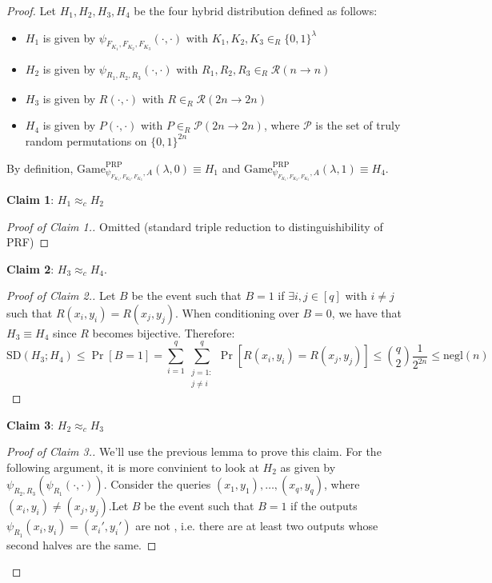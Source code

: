 \documentclass[a4paper, 12pt]{report}
\begin{document}
    \begin{proof}
        Let $H_1, H_2, H_3, H_4$ be the four hybrid distribution defined as follows:
        \begin{itemize}
            \item $H_1$ is given by $\psi_{F_{K_1}, F_{K_2}, F_{K_3}}(\cdot, \cdot)$ with $K_1,K_2,K_3 \in_R \{0,1\}^\lambda$
            \item $H_2$ is given by $\psi_{R_1, R_2, R_3}(\cdot, \cdot)$ with $R_1,R_2,R_3 \in_R \mathcal{R}(n \to n)$
            \item $H_3$ is given by $R(\cdot, \cdot)$ with $R \in_R \mathcal{R}(2n \to 2n)$
            \item $H_4$ is given by $P(\cdot, \cdot)$ with $P \in_R \mathcal{P}(2n \to 2n)$, where $\mathcal{P}$ is the set of truly random permutations on $\{0,1\}^{2n}$
        \end{itemize}

        By definition, $\mathrm{Game}_{\psi_{F_{K_1}, F_{K_2}, F_{K_3}}, A}^{\text{PRP}}(\lambda, 0) \equiv H_1$ and $\mathrm{Game}_{\psi_{F_{K_1}, F_{K_2}, F_{K_3}}, A}^{\text{PRP}}(\lambda, 1) \equiv H_4$.

        \textbf{Claim 1}: $H_1 \approx_c H_2$

        \begin{proof}[Proof of Claim 1.]
            Omitted (standard triple reduction to distinguishibility of PRF)
        \end{proof}

        \textbf{Claim 2}: $H_3 \approx_c H_4$.

        \begin{proof}[Proof of Claim 2.]
            Let $B$ be the event such that $B = 1$ if $\exists i,j \in [q]$ with $i \neq j$ such that $R(x_i, y_i) = R(x_j, y_j)$. When conditioning over $B = 0$, we have that $H_3 \equiv H_4$ since $R$ becomes bijective. Therefore:
            \[\mathrm{SD}(H_3; H_4) \leq \Pr[B = 1] = \sum_{i = 1}^{q} \sum_{\substack{j = 1 :\\ j \neq i}}^{q} \Pr[R(x_i, y_i) = R(x_j, y_j)] \leq \binom{q}{2}\frac{1}{2^{2n}} \leq \mathrm{negl}(n)\]
        \end{proof}

        \textbf{Claim 3}: $H_2 \approx_c H_3$

        \begin{proof}[Proof of Claim 3.]
            We'll use the previous lemma to prove this claim. For the following argument, it is more convinient to look at $H_2$ as given by $\psi_{R_2, R_3}(\psi_{R_1}(\cdot, \cdot))$. Consider the queries $(x_1, y_1), \ldots, (x_q, y_q)$, where $(x_i, y_i) \neq (x_j, y_j)$.Let $B$ be the event such that $B = 1$ if the outputs $\psi_{R_1}(x_i, y_i) = (x_i', y_i')$ are not , i.e. there are at least two outputs whose second halves are the same.


\end{proof}
\end{proof}
\end{document}
